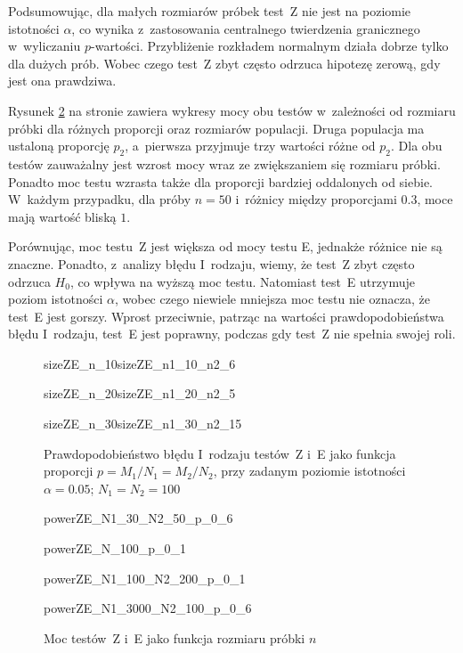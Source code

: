 Podsumowując, dla małych rozmiarów próbek test~Z nie jest na poziomie istotności $\alpha$, co wynika z~zastosowania centralnego twierdzenia granicznego w~wyliczaniu $p$-wartości. Przybliżenie rozkładem normalnym działa dobrze tylko dla dużych prób. Wobec czego test~Z zbyt często odrzuca hipotezę zerową, gdy jest ona prawdziwa. 

Rysunek \ref{powerZE_n} na stronie \pageref{powerZE_n} zawiera wykresy mocy obu testów w~zależności od rozmiaru próbki dla różnych proporcji oraz rozmiarów populacji. Druga populacja ma ustaloną proporcję $p_2$, a~pierwsza przyjmuje trzy wartości różne od $p_2$. Dla obu testów zauważalny jest wzrost mocy wraz ze zwiększaniem się rozmiaru próbki. Ponadto moc testu wzrasta także dla proporcji bardziej oddalonych od siebie. W~każdym przypadku, dla próby $n=50$ i~różnicy między proporcjami $0.3$, moce mają wartość bliską $1$. 

Porównując, moc testu~Z jest większa od mocy testu E, jednakże różnice nie są znaczne. Ponadto, z~analizy błędu I~rodzaju, wiemy, że test~Z zbyt często odrzuca $H_0$, co wpływa na wyższą moc testu. Natomiast test~E utrzymuje poziom istotności $\alpha$, wobec czego niewiele mniejsza moc testu nie oznacza, że test~E jest gorszy. Wprost przeciwnie, patrząc na wartości prawdopodobieństwa błędu I~rodzaju, test~E jest poprawny, podczas gdy test~Z nie spełnia swojej roli.

\begin{figure}[H]
	\begin{subdiagrams}{sizeZE_n_10}{sizeZE_n1_10_n2_6}
	\end{subdiagrams}
	
	\begin{subdiagrams}{sizeZE_n_20}{sizeZE_n1_20_n2_5}
	\end{subdiagrams}
	
	\begin{subdiagrams}{sizeZE_n_30}{sizeZE_n1_30_n2_15}
	\end{subdiagrams}
	\caption{Prawdopodobieństwo błędu I~rodzaju testów~Z i~E jako funkcja proporcji $p=M_1/N_1=M_2/N_2$, przy zadanym poziomie istotności $\alpha=0.05$; $N_1=N_2=100$}
	\label{sizeZE_p}
\end{figure}


\begin{figure}[H]
	\begin{subdiagram}{powerZE_N1_30_N2_50_p_0_6}
	\end{subdiagram}
	\begin{subdiagram}{powerZE_N_100_p_0_1}
	\end{subdiagram}
	\begin{subdiagram}{powerZE_N1_100_N2_200_p_0_1}
	\end{subdiagram}
	\begin{subdiagram}{powerZE_N1_3000_N2_100_p_0_6}
	\end{subdiagram}
	
	\caption{Moc testów~Z i~E jako funkcja rozmiaru próbki $n$}
	\label{powerZE_n}
\end{figure}

